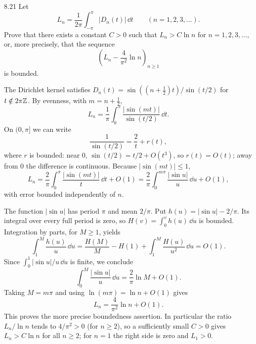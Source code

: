 \documentclass[11pt, oneside]{article}
\begin{document}
\begin{exercise}{8.21}
Let
\[
 L_n=\frac1{2\pi}\int_{-\pi}^\pi|D_n(t)|\,\dd t\qquad(n=1, 2, 3, \ldots).
\]
Prove that there exists a constant $C>0$ such that $L_n>C\ln n$ for $n=1, 2, 3, \ldots$, or, more precisely, that the sequence
\[
 \left(L_n-\frac4{\pi^2}\ln n\right)_{n\ge1}
\]
is bounded.
\end{exercise}
\begin{solution}
The Dirichlet kernel satisfies $D_n(t)=\sin((n+\frac12)t)/\sin(t/2)$ for $t\notin2\pi\mathbb{Z}$. By evenness, with $m=n+\frac12$,
\[
 L_n=\frac1\pi\int_0^\pi\frac{|\sin(mt)|}{\sin(t/2)}\,\dd t.
\]
On $(0, \pi]$ we can write
\[
 \frac1{\sin(t/2)}=\frac2t+r(t),
\]
where $r$ is bounded: near $0$, $\sin(t/2)=t/2+O(t^3)$, so $r(t)=O(t)$; away from $0$ the difference is continuous. Because $|\sin(mt)|\le1$,
\[
 L_n=\frac2\pi\int_0^\pi\frac{|\sin(mt)|}{t}\,\dd t+O(1)
 =\frac2\pi\int_0^{m\pi}\frac{|\sin u|}{u}\,\dd u+O(1),
\]
with error bounded independently of $n$.

The function $|\sin u|$ has period $\pi$ and mean $2/\pi$. Put $h(u)=|\sin u|-2/\pi$. Its integral over every full period is zero, so $H(v)=\int_0^v h(u)\,\dd u$ is bounded. Integration by parts, for $M\ge1$, yields
\[
 \int_1^M\frac{h(u)}u\,\dd u
 =\frac{H(M)}M-H(1)+\int_1^M\frac{H(u)}{u^2}\,\dd u=O(1).
\]
Since $\int_0^1|\sin u|/u\,\dd u$ is finite, we conclude
\[
 \int_0^M\frac{|\sin u|}u\,\dd u
 =\frac2\pi\ln M+O(1).
\]
Taking $M=m\pi$ and using $\ln(m\pi)=\ln n+O(1)$ gives
\[
 L_n=\frac4{\pi^2}\ln n+O(1).
\]
This proves the more precise boundedness assertion. In particular the ratio $L_n/\ln n$ tends to $4/\pi^2>0$ (for $n\ge2$), so a sufficiently small $C>0$ gives $L_n>C\ln n$ for all $n\ge2$; for $n=1$ the right side is zero and $L_1>0$.
\end{solution}
\end{document}
